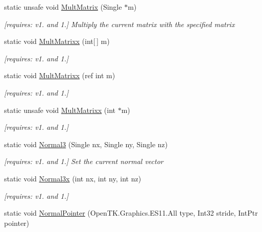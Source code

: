 \begin{DoxyCompactItemize}
static unsafe void \hyperlink{class_open_t_k_1_1_graphics_1_1_e_s11_1_1_g_l_a8cdcf54598135c8c16630f5faaa5e994}{Mult\-Matrix} (Single $\ast$m)
\begin{DoxyCompactList}\small\item\em \mbox{[}requires\-: v1. and 1.\mbox{]} Multiply the current matrix with the specified matrix \end{DoxyCompactList}\item 
static void \hyperlink{class_open_t_k_1_1_graphics_1_1_e_s11_1_1_g_l_a0eadc2994b1415c6c5a56ca589642a7c}{Mult\-Matrixx} (int\mbox{[}$\,$\mbox{]} m)
\begin{DoxyCompactList}\small\item\em \mbox{[}requires\-: v1. and 1.\mbox{]}\end{DoxyCompactList}\item 
static void \hyperlink{class_open_t_k_1_1_graphics_1_1_e_s11_1_1_g_l_ad655920691e490d32d0c669f92308afb}{Mult\-Matrixx} (ref int m)
\begin{DoxyCompactList}\small\item\em \mbox{[}requires\-: v1. and 1.\mbox{]}\end{DoxyCompactList}\item 
static unsafe void \hyperlink{class_open_t_k_1_1_graphics_1_1_e_s11_1_1_g_l_a512177dfefcfb7aa9783312177f021d4}{Mult\-Matrixx} (int $\ast$m)
\begin{DoxyCompactList}\small\item\em \mbox{[}requires\-: v1. and 1.\mbox{]}\end{DoxyCompactList}\item 
static void \hyperlink{class_open_t_k_1_1_graphics_1_1_e_s11_1_1_g_l_aa2cb948bf46ba5161b099555e3b10269}{Normal3} (Single nx, Single ny, Single nz)
\begin{DoxyCompactList}\small\item\em \mbox{[}requires\-: v1. and 1.\mbox{]} Set the current normal vector \end{DoxyCompactList}\item 
static void \hyperlink{class_open_t_k_1_1_graphics_1_1_e_s11_1_1_g_l_a0af48b9c857739076b5f17c0778ca44a}{Normal3x} (int nx, int ny, int nz)
\begin{DoxyCompactList}\small\item\em \mbox{[}requires\-: v1. and 1.\mbox{]}\end{DoxyCompactList}\item 
static void \hyperlink{class_open_t_k_1_1_graphics_1_1_e_s11_1_1_g_l_a1be99fce9531917d1a52afe60ed2bce1}{Normal\-Pointer} (Open\-T\-K.\-Graphics.\-E\-S11.\-All type, Int32 stride, Int\-Ptr pointer)

\end{DoxyCompactItemize}
